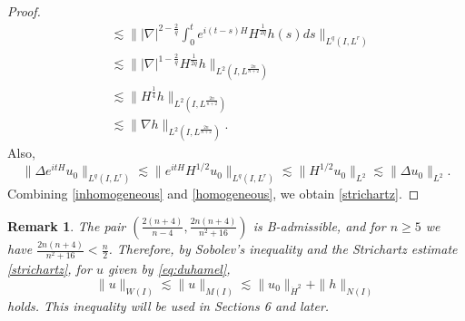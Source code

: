 \documentclass[11pt,a4paper]{article}
\numberwithin{equation}{section}
\newtheorem{remark}{Remark}[section]
\begin{document}
\begin{proof}
\begin{equation}
\begin{aligned}
&\lesssim \||\nabla|^{2 - \frac{2}{q}} \int_{0}^{t} e^{i(t - s)H}H^{\frac{1}{2q}}h(s) ds\|_{L^{q}(I, L^{r})} \\
&\lesssim \||\nabla|^{1 - \frac{2}{q}} H^{\frac{1}{2q}}h\|_{L^{2}(I, L^{\frac{2n}{n + 2}})} \\
&\lesssim \|H^{\frac{1}{4}}h\|_{L^{2}(I, L^{\frac{2n}{n + 2}})}  \\
&\lesssim \|\nabla h\|_{L^{2}(I, L^{\frac{2n}{n + 2}})}.
\end{aligned}
\end{equation}
Also,
\begin{equation}\label{homogeneous}
\|\Delta e^{itH}u_{0}\|_{L^{q}(I, L^{r})} \lesssim \|e^{itH}H^{1/2}u_{0}\|_{L^{q}(I, L^{r})} \lesssim \|H^{1/2}u_{0}\|_{L^{2}} \lesssim \|\Delta u_{0}\|_{L^{2}}.
\end{equation}
Combining \eqref{inhomogeneous} and \eqref{homogeneous}, we obtain \eqref{strichartz}.
\end{proof}

\begin{remark}
The pair $\left(\frac{2(n+4)}{n-4}, \frac{2n(n+4)}{n^{2}+16} \right)$ is B-admissible, and for $n \geq 5$ we have $\frac{2n(n+4)}{n^{2}+16} < \frac{n}{2}$. Therefore, by Sobolev's inequality and the Strichartz estimate \eqref{strichartz}, for $u$ given by \eqref{eq:duhamel},
\[ \|u\|_{W(I)} \lesssim \|u\|_{M(I)} \lesssim \|u_{0}\|_{\dot{H}^{2}} + \|h\|_{N(I)} \]
holds. This inequality will be used in Sections 6 and later.
\end{remark}
\end{document}
